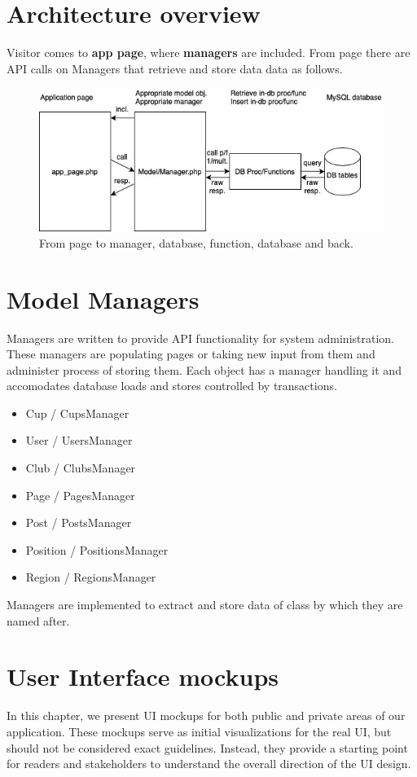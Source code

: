 \section{Architecture overview}
Visitor comes to \textbf{app page}, where \textbf{managers} are included. From page there are API calls on Managers that retrieve and store data data as follows.
\newline
\begin{figure}[h]	
	\centering	
    \includegraphics[scale=0.707]{img/app-schema.jpg}
	\caption{From page to manager, database, function, database and back.}
	\label{fig2.1:appschema}
\end{figure}
\section{Model Managers}
Managers are written to provide API functionality for system administration. These managers are populating pages or taking new input from them and administer process of storing them. Each object has a manager handling it and accomodates database loads and stores controlled by transactions.
\begin{itemize}
    \item Cup / CupsManager
    \item User / UsersManager
    \item Club / ClubsManager
    \item Page / PagesManager
    \item Post / PostsManager
    \item Position / PositionsManager
    \item Region / RegionsManager
\end{itemize}
Managers are implemented to extract and store data of class by which they are named after.
\newpage
\section{User Interface mockups}
In this chapter, we present UI mockups for both public and private areas of our application. These mockups serve as initial visualizations for the real UI, but should not be considered exact guidelines. Instead, they provide a starting point for readers and stakeholders to understand the overall direction of the UI design.
